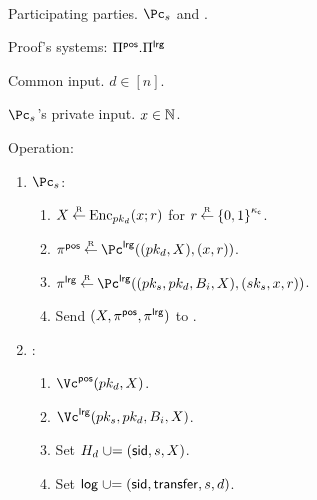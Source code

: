 \begin{protocol}~\label{prot:ConfidentialTransactions:Transfer}
	\item[Participating parties.] $\Pc_s$ and \Cc.
	
	\item[Proof's systems:] $\Pi^{\mathsf{pos}}.\Pi^{\mathsf{lrg}}$
	\item[Common input.] $d \in [n]$.
	
	
	\item[$\Pc_s$'s private  input.] $x \in {\mathbb{N}}$.
	
	\item Operation: 
	
	\begin{enumerate}
		\item  $\Pc_s$: 
		
		\begin{enumerate}
			\item $X \mathbin{\stackrel{\mbox{\tiny R}}{\leftarrow}} \operatorname{Enc}_{pk_d}(x;r)$ for $r \getsr \zo^\ckappa$.
			
			\item $\pi^\posvst \getsr \Pc^\largest((pk_d,X),(x,r))$.
			
			\item $\pi^\largest \getsr \Pc^\largest((pk_s,pk_d,B_i,X),(sk_s,x,r))$.
			
			\item Send $(X,\pi^{\mathsf{pos}},\pi^{\mathsf{lrg}})$ to \Cc.
		\end{enumerate}
		
		
		\item  \Cc: 
		
		\begin{enumerate}
			\item  $\Vc^\posvst(pk_d,X)$.
			
			\item  $\Vc^\largest(pk_s,pk_d,B_i,X)$.
		
		     \item  Set $H_d \mathrel{\cup}=  (\mathsf{sid},s,X)$. 
		     
		     \item Set $\mathsf{log} \mathrel{\cup}= (\mathsf{sid},\mathsf{transfer},s,d)$.
		\end{enumerate}
		
	\end{enumerate}
	
\end{protocol}

